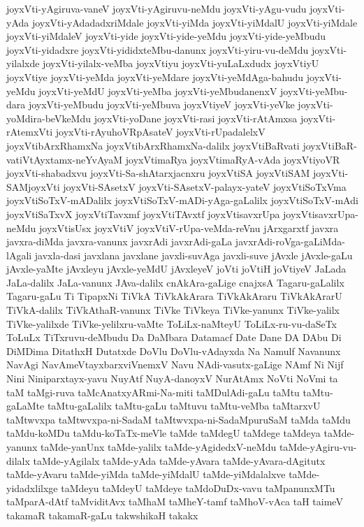 {joyxVti-yAgiruva-vaneV
joyxVti-yAgiruvu-neMdu
joyxVti-yAgu-vudu
joyxVti-yAda
joyxVti-yAdadadxriMdale
joyxVti-yiMda
joyxVti-yiMdalU
joyxVti-yiMdale
joyxVti-yiMdaleV
joyxVti-yide
joyxVti-yide-yeMdu
joyxVti-yide-yeMbudu
joyxVti-yidadxre
joyxVti-yididxteMbu-danunx
joyxVti-yiru-vu-deMdu
joyxVti-yilalxde
joyxVti-yilalx-veMba
joyxVtiyu
joyxVti-yuLaLxdudx
joyxVtiyU
joyxVtiye
joyxVti-yeMda
joyxVti-yeMdare
joyxVti-yeMdAga-bahudu
joyxVti-yeMdu
joyxVti-yeMdU
joyxVti-yeMba
joyxVti-yeMbudanenxV
joyxVti-yeMbu-dara
joyxVti-yeMbudu
joyxVti-yeMbuva
joyxVtiyeV
joyxVti-yeVke
joyxVti-yoMdira-beVkeMdu
joyxVti-yoDane
joyxVti-rasi
joyxVti-rAtAmxsa
joyxVti-rAtemxVti
joyxVti-rAyuhoVRpAsateV
joyxVti-rUpadalelxV
joyxVtibArxRhamxNa
joyxVtibArxRhamxNa-dalilx
joyxVtiBaRvati
joyxVtiBaR-vatiVtAyxtamx-neYvAyaM
joyxVtimaRya
joyxVtimaRyA-vAda
joyxVtiyoVR
joyxVti-shabadxvu
joyxVti-Sa-shAtarxjacnxru
joyxVtiSA
joyxVtiSAM
joyxVti-SAMjoyxVti
joyxVti-SAsetxV
joyxVti-SAsetxV-palayx-yateV
joyxVtiSoTxVma
joyxVtiSoTxV-mADalilx
joyxVtiSoTxV-mADi-yAga-gaLalilx
joyxVtiSoTxV-mAdi
joyxVtiSaTxvX
joyxVtiTavxmf
joyxVtiTAvxtf
joyxVtisavxrUpa
joyxVtisavxrUpa-neMdu
joyxVtisUsx
joyxVtiV
joyxVtiV-rUpa-veMda-reVnu
jArxgarxtf
javxra
javxra-diMda
javxra-vanunx
javxrAdi
javxrAdi-gaLa
javxrAdi-roVga-gaLiMda-lAgali
javxla-dasi
javxlana
javxlane
javxli-suvAga
javxli-suve
jAvxle
jAvxle-gaLu
jAvxle-yaMte
jAvxleyu
jAvxle-yeMdU
jAvxleyeV
joVti
joVtiH
joVtiyeV
JaLada
JaLa-dalilx
JaLa-vanunx
JAva-dalilx
cnAkAra-gaLige
cnajxsA
Tagaru-gaLalilx
Tagaru-gaLu
Ti
TipapxNi
TiVkA
TiVkAkArara
TiVkAkAraru
TiVkAkArarU
TiVkA-dalilx
TiVkAthaR-vanunx
TiVke
TiVkeya
TiVke-yanunx
TiVke-yalilx
TiVke-yalilxde
TiVke-yelilxru-vaMte
ToLiLx-naMteyU
ToLiLx-ru-vu-daSeTx
ToLuLx
TiTxruvu-deMbudu
Da
DaMbara
Datamacf
Date
Dane
DA
DAbu
Di
DiMDima
DitathxH
Dutatxde
DoVlu
DoVlu-vAdayxda
Na
Namulf
Navanunx
NavAgi
NavAmeVtayxbarxviVnemxV
Navu
NAdi-vasutx-gaLige
NAmf
Ni
Nijf
Nini
Niniparxtayx-yavu
NuyAtf
NuyA-danoyxV
NurAtAmx
NoVti
NoVmi
ta
taM
taMgi-ruva
taMcAnatxyARmi-Na-miti
taMDulAdi-gaLu
taMtu
taMtu-gaLaMte
taMtu-gaLalilx
taMtu-gaLu
taMtuvu
taMtu-veMba
taMtarxvU
taMtwvxpa
taMtwvxpa-ni-SadaM
taMtwvxpa-ni-SadaMpuruSaM
taMda
taMdu
taMdu-koMDu
taMdu-koTaTx-meVle
taMde
taMdegU
taMdege
taMdeya
taMde-yanunx
taMde-yanUnx
taMde-yalilx
taMde-yAgidedxV-neMdu
taMde-yAgiru-vu-dilalx
taMde-yAgilalx
taMde-yAda
taMde-yAvara
taMde-yAvara-dAgitutx
taMde-yAvaru
taMde-yiMda
taMde-yiMdalU
taMde-yiMdalalxve
taMde-yidadxlilxge
taMdeyu
taMdeyU
taMdeye
taMdoDuDx-vavu
taMpanunxMTu
taMparA-dAtf
taMviditAvx
taMhaM
taMheY-tamf
taMhoV-vAca
taH
taimeV
takamaR
takamaR-gaLu
takwshikaH
takakx
}
